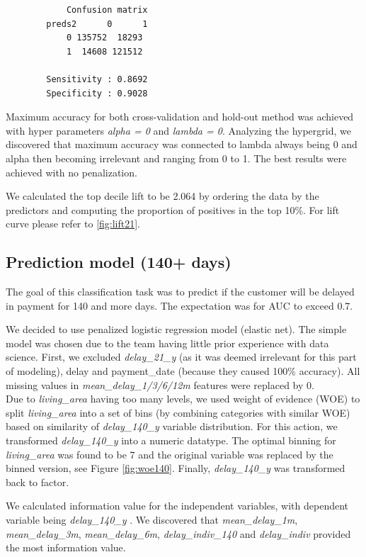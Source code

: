 \documentclass[
]{article}
\begin{document}
\begin{verbatim}
            Confusion matrix
        preds2      0      1
            0 135752  18293
            1  14608 121512
            
        Sensitivity : 0.8692          
        Specificity : 0.9028 
\end{verbatim}

Maximum accuracy for both cross-validation and hold-out method was achieved with hyper parameters \emph{alpha = 0} and \emph{lambda = 0}. Analyzing the hypergrid, we discovered that maximum accuracy was connected to lambda always being 0 and alpha then becoming irrelevant and ranging from 0 to 1. The best results were achieved with no penalization.

We calculated the top decile lift to be 2.064 by ordering the data by the predictors and computing the proportion of positives in the top 10\%. For lift curve please refer to \ref{fig:lift21}.

\hypertarget{prediction-model-140-days}{%
\subsection{Prediction model (140+ days)}\label{prediction-model-140-days}}

The goal of this classification task was to predict if the customer will be delayed in payment for 140 and more days. The expectation was for AUC to exceed 0.7.

We decided to use penalized logistic regression model (elastic net). The simple model was chosen due to the team having little prior experience with data science. First, we excluded \emph{delay\_21\_y} (as it was deemed irrelevant for this part of modeling), delay and payment\_date (because they caused 100\% accuracy). All missing values in \emph{mean\_delay\_1/3/6/12m} features were replaced by 0.\\
Due to \emph{living\_area} having too many levels, we used weight of evidence (WOE) to split \emph{living\_area} into a set of bins (by combining categories with similar WOE) based on similarity of \emph{delay\_140\_y} variable distribution. For this action, we transformed \emph{delay\_140\_y} into a numeric datatype. The optimal binning for \emph{living\_area} was found to be 7 and the original variable was replaced by the binned version, see Figure \ref{fig:woe140}. Finally, \emph{delay\_140\_y} was transformed back to factor.

We calculated information value for the independent variables, with dependent variable being \emph{delay\_140\_y} . We discovered that \emph{mean\_delay\_1m}, \emph{mean\_delay\_3m}, \emph{mean\_delay\_6m}, \emph{delay\_indiv\_140} and \emph{delay\_indiv} provided the most information value.
\end{document}
